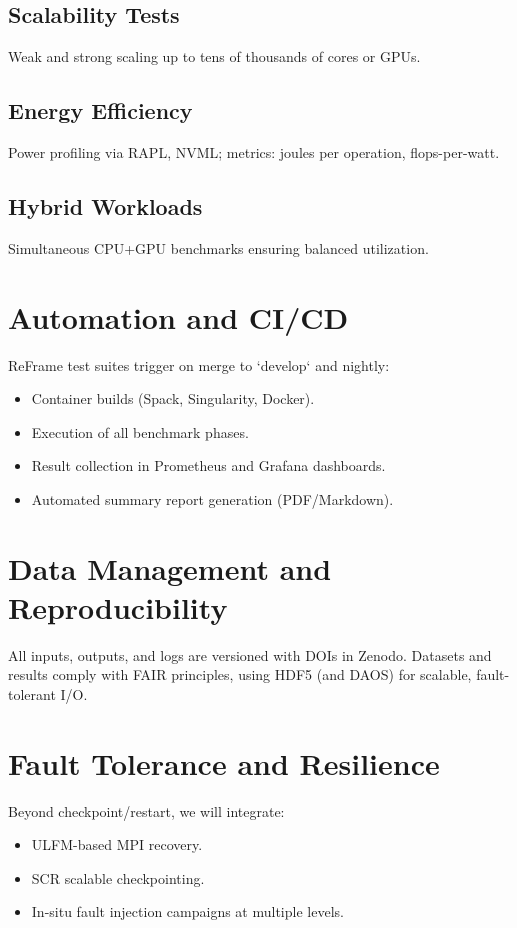 \subsection{Scalability Tests}
Weak and strong scaling up to tens of thousands of cores or GPUs.

\subsection{Energy Efficiency}
Power profiling via RAPL, NVML; metrics: joules per operation, flops-per-watt.

\subsection{Hybrid Workloads}
Simultaneous CPU+GPU benchmarks ensuring balanced utilization.

\section{Automation and CI/CD}
ReFrame test suites trigger on merge to `develop` and nightly:
\begin{itemize}
  \item Container builds (Spack, Singularity, Docker).
  \item Execution of all benchmark phases.
  \item Result collection in Prometheus and Grafana dashboards.
  \item Automated summary report generation (PDF/Markdown).
\end{itemize}

\section{Data Management and Reproducibility}
All inputs, outputs, and logs are versioned with DOIs in Zenodo. Datasets and results comply with FAIR principles, using HDF5 (and DAOS) for scalable, fault-tolerant I/O.

\section{Fault Tolerance and Resilience}
Beyond checkpoint/restart, we will integrate:
\begin{itemize}
  \item ULFM-based MPI recovery.
  \item SCR scalable checkpointing.
  \item In-situ fault injection campaigns at multiple levels.
\end{itemize}

